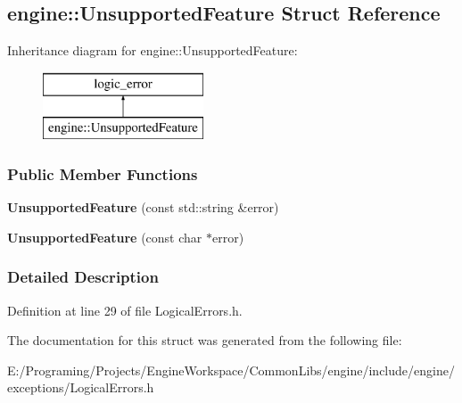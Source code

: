 \hypertarget{a00078}{}\subsection{engine\+:\+:Unsupported\+Feature Struct Reference}
\label{a00078}
Inheritance diagram for engine\+:\+:Unsupported\+Feature\+:\begin{figure}[H]
\begin{center}
\leavevmode
\includegraphics[height=2.000000cm]{a00078}
\end{center}
\end{figure}
\subsubsection*{Public Member Functions}
\begin{DoxyCompactItemize}
\item 
{\bfseries Unsupported\+Feature} (const std\+::string \&error)\hypertarget{a00078_adf506e7a80acd5615803065c18b55b8d}{}\label{a00078_adf506e7a80acd5615803065c18b55b8d}

\item 
{\bfseries Unsupported\+Feature} (const char $\ast$error)\hypertarget{a00078_a0774b1ed4a1653d17c14053dc87e427e}{}\label{a00078_a0774b1ed4a1653d17c14053dc87e427e}

\end{DoxyCompactItemize}


\subsubsection{Detailed Description}


Definition at line 29 of file Logical\+Errors.\+h.



The documentation for this struct was generated from the following file\+:\begin{DoxyCompactItemize}
\item 
E\+:/\+Programing/\+Projects/\+Engine\+Workspace/\+Common\+Libs/engine/include/engine/exceptions/Logical\+Errors.\+h\end{DoxyCompactItemize}

